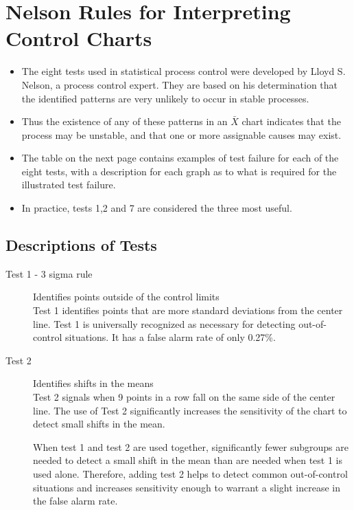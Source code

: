 \documentclass[]{article}
\begin{document}
\section{Nelson Rules for Interpreting Control Charts}
{\large
\begin{itemize}
\item The eight tests used in statistical process control were developed by Lloyd S. Nelson, a process control expert. They are
based on his determination that the identified patterns are very unlikely to occur in stable processes.

\item Thus
the existence of any of these patterns in an $\bar{X}$ chart indicates that the process may be unstable, and that one or
more assignable causes may exist. 

\item The table on the next page contains examples of test failure for each of the eight tests,
with a description for each graph as to what is required for the illustrated test failure.

\item In practice, tests 1,2 and 7 are considered the three most useful.
\end{itemize}
}
{
\large
\subsection{Descriptions of Tests}
\begin{description}
\item[Test 1 - 3 sigma rule] Identifies points outside of the control limits\\
Test 1 identifies points that are more standard deviations from the center line. Test 1 is
universally recognized as necessary for detecting out-of-control situations. It has a
false alarm rate of only 0.27\%.

\item[Test 2] Identifies shifts in the means \\
Test 2 signals when 9 points in a row fall on the same side of the center line.  The use of Test 2
significantly increases the sensitivity of the chart to detect small shifts in the mean.

When test 1 and test 2 are used together, significantly fewer subgroups are needed
to detect a small shift in the mean than are needed when test 1 is used alone.
Therefore, adding test 2 helps to detect common out-of-control situations and
increases sensitivity enough to warrant a slight increase in the false alarm rate.
\end{description}
}
\end{document}
